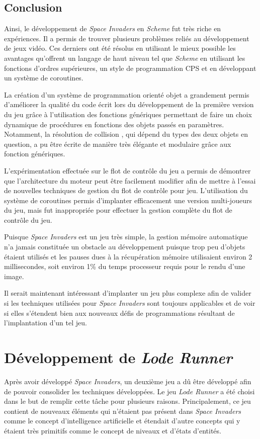 \documentclass[12pt,twoside,letterpaper,francais]{book}
\newcommand{\lr}{{\textit{Lode Runner }}}
\newcommand{\si}{{\textit{Space Invaders }}}
\newcommand{\Schemelang}{{\textit{Scheme }}}
\begin{document}
\FloatBarrier
\subsection{Conclusion}
Ainsi, le développement de \si en \Schemelang fut très riche en
expériences. Il a permis de trouver plusieurs problèmes reliés au
développement de jeux vidéo. Ces derniers ont été résolus en utilisant
le mieux possible les avantages qu'offrent un langage de haut niveau
tel que \Schemelang en utilisant les fonctions d'ordres supérieures, un
style de programmation CPS et en développant un système de coroutines.

La création d'un système de programmation orienté objet a grandement
permis d'améliorer la qualité du code écrit lors du développement de
la première version du jeu grâce à l'utilisation des fonctions
génériques permettant de faire un choix dynamique de procédures en
fonctions des objets passés en paramètres. Notamment, la résolution de
collision , qui dépend du types des deux objets en question, a pu être
écrite de manière très élégante et modulaire grâce aux fonction
génériques.

L'expérimentation effectuée sur le flot de contrôle du jeu a permis de
démontrer que l'architecture du moteur peut être facilement modifier
afin de mettre à l'essai de nouvelles techniques de gestion du flot de
contrôle pour jeu. L'utilisation du système de coroutines permis
d'implanter efficacement une version multi-joueurs du jeu, mais fut
inappropriée pour effectuer la gestion complète du flot de contrôle du
jeu.

Puisque \si est un jeu très simple, la gestion mémoire automatique n'a
jamais constituée un obstacle au développement puisque trop peu
d'objets étaient utilisés et les pauses dues à la récupération mémoire
utilisaient environ 2 millisecondes, soit environ 1\% du temps
processeur requis pour le rendu d'une image.

Il serait maintenant intéressant d'implanter un jeu plus complexe afin
de valider si les techniques utilisées pour \si sont toujours
applicables et de voir si elles s'étendent bien aux nouveaux défis de
programmations résultant de l'implantation d'un tel jeu.


\FloatBarrier
\section{Développement de \lr} \label{Exp:ld}
Après avoir développé \textit{Space Invaders}, un deuxième jeu a dû
être développé afin de pouvoir consolider les techniques
développées. Le jeu \lr a été choisi dans le but de remplir cette
tâche pour plusieurs raisons. Principalement, ce jeu contient de
nouveaux éléments qui n'étaient pas présent dans \si comme le concept
d'intelligence artificielle et étendait d'autre concepts qui y étaient
très primitifs comme le concept de niveaux et d'états d'entités.
\end{document}
